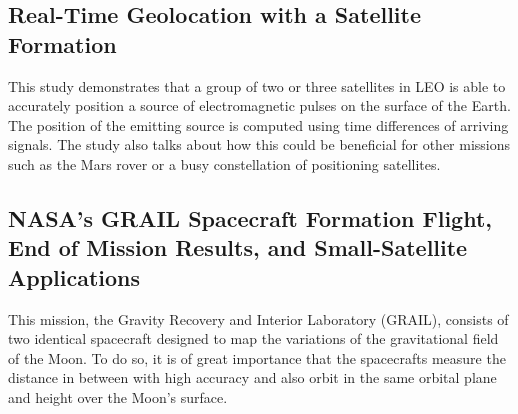 \subsection{Real-Time Geolocation with a Satellite Formation}

This study demonstrates that a group of two or three satellites in
LEO is able to accurately position a source of electromagnetic pulses
on the surface of the Earth. The position of the emitting source is
computed using time differences of arriving signals. The study also
talks about how this could be beneficial for other missions such as
the Mars rover or a busy constellation of positioning satellites.\cite{Leiter_Geoloc}

\subsection{NASA\textquoteright{}s GRAIL Spacecraft Formation Flight, End of Mission Results, and Small-Satellite Applications}

This mission, the Gravity Recovery and Interior Laboratory (GRAIL),
consists of two identical spacecraft designed to map the variations
of the gravitational field of the Moon. To do so, it is of great importance
that the spacecrafts measure the distance in between with high accuracy
and also orbit in the same orbital plane and height over the Moon's
surface.\cite{Edward_GRAIL}
